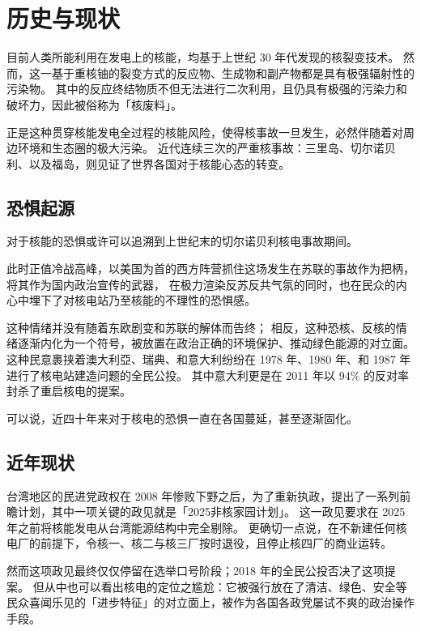 
\chapter{历史与现状}

目前人类所能利用在发电上的核能，均基于上世纪 30 年代发现的核裂变技术。
然而，这一基于重核铀的裂变方式的反应物、生成物和副产物都是具有极强辐射性的污染物。
其中的反应终结物质不但无法进行二次利用，且仍具有极强的污染力和破坏力，因此被俗称为「核废料」。

正是这种贯穿核能发电全过程的核能风险，使得核事故一旦发生，必然伴随着对周边环境和生态圈的极大污染。
近代连续三次的严重核事故：三里岛、切尔诺贝利、以及福岛，则见证了世界各国对于核能心态的转变。

\section{恐惧起源}
对于核能的恐惧或许可以追溯到上世纪末的切尔诺贝利核电事故期间。

此时正值冷战高峰，以美国为首的西方阵营抓住这场发生在苏联的事故作为把柄，将其作为国内政治宣传的武器，
在极力渲染反苏反共气氛的同时，也在民众的内心中埋下了对核电站乃至核能的不理性的恐惧感。

这种情绪并没有随着东欧剧变和苏联的解体而告终；
相反，这种恐核、反核的情绪逐渐内化为一个符号，被放置在政治正确的环境保护、推动绿色能源的对立面。
这种民意裹挟着澳大利亞、瑞典、和意大利纷纷在 1978 年、1980 年、和 1987 年进行了核电站建造问题的全民公投\cite{wiki1}。
其中意大利更是在 2011 年以 94\% 的反对率封杀了重启核电的提案\cite{itgov}。

可以说，近四十年来对于核电的恐惧一直在各国蔓延，甚至逐渐固化。

\section{近年现状}

台湾地区的民进党政权在 2008 年惨败下野之后，为了重新执政，提出了一系列前瞻计划，其中一项关键的政见就是「2025非核家园计划」\cite{iwt}。
这一政见要求在 2025 年之前将核能发电从台湾能源结构中完全剔除。
更确切一点说，在不新建任何核电厂的前提下，令核一、核二与核三厂按时退役，且停止核四厂的商业运转。

然而这项政见最终仅仅停留在选举口号阶段；2018 年的全民公投否决了这项提案。
但从中也可以看出核电的定位之尴尬：它被强行放在了清洁、绿色、安全等民众喜闻乐见的「进步特征」的对立面上，被作为各国各政党屡试不爽的政治操作手段。

